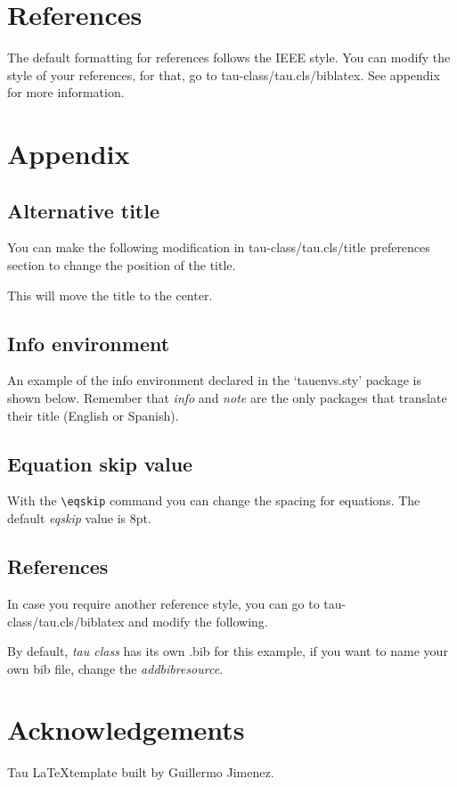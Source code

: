 \documentclass[9pt,a4paper,twoside]{tau-class/tau}
\begin{document}
\section{References}

    The default formatting for references follows the IEEE style. You can modify the style of your references, for that, go to tau-class/tau.cls/biblatex. See appendix for more information.
	
\section{Appendix}

    \subsection{Alternative title}

        You can make the following modification in tau-class/tau.cls/title preferences section to change the position of the title.

	This will move the title to the center. 

    \subsection{Info environment}

        An example of the info environment declared in the ‘tauenvs.sty’ package is shown below. Remember that \textit{info} and \textit{note} are the only packages that translate their title (English or Spanish).
		

    \subsection{Equation skip value}

        With the \verb|\eqskip| command you can change the spacing for equations. The default \textit{eqskip} value is 8pt.

		
    \subsection{References}
		
        In case you require another reference style, you can go to tau-class/tau.cls/biblatex and modify the following.
		

        By default, \textit{tau class} has its own .bib for this example, if you want to name your own bib file, change the \textit{addbibresource}.
		

\section{Acknowledgements}

Tau \LaTeX template built by Guillermo Jimenez.


\printbibliography

\end{document}
